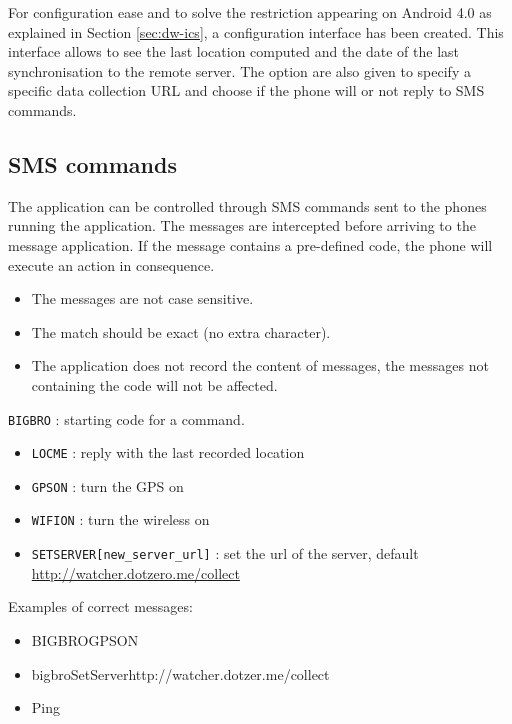 For configuration ease and to solve the restriction appearing on Android 4.0 as explained in Section \ref{sec:dw-ics}, a configuration interface has been created.
This interface allows to see the last location computed and the date of the last synchronisation to the remote server.
The option are also given to specify a specific data collection URL and choose if the phone will or not reply to SMS commands.

\subsection{SMS commands}
\label{sec:dw-smscom}

The application can be controlled through SMS commands sent to the phones running the application.
The messages are intercepted before arriving to the message application.
If the message contains a pre-defined code, the phone will execute an action in consequence.

\begin{itemize}
\item The messages are not case sensitive.
\item The match should be exact (no extra character).
\item The application does not record the content of messages, the messages not containing the code will not be affected.
\end{itemize}

\vspace{0.5cm}
\texttt{BIGBRO} : starting code for a command.
\begin{itemize}
\item \texttt{LOCME} : reply with the last recorded location
\item \texttt{GPSON} : turn the GPS on
\item \texttt{WIFION} : turn the wireless on
\item \texttt{SETSERVER[new\_server\_url]} : set
  the url of the server, default
  \url{http://watcher.dotzero.me/collect}
\end{itemize}

\vspace{0.5cm}
Examples of correct messages:
\begin{itemize}
\item BIGBROGPSON
\item bigbroSetServerhttp://watcher.dotzer.me/collect
\item Ping
\end{itemize}

